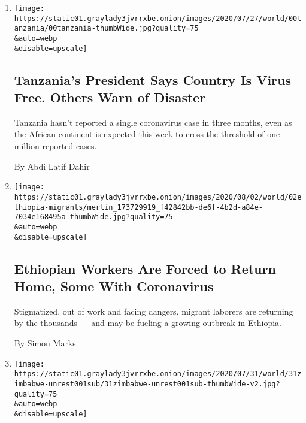 \begin{enumerate}
\def\labelenumi{\arabic{enumi}.}
\item
  \href{/2020/08/04/world/africa/tanzanias-coronavirus-president.html}{}

  \texttt{[image: https://static01.graylady3jvrrxbe.onion/images/2020/07/27/world/00tanzania/00tanzania-thumbWide.jpg?quality=75\\\&auto=webp\\\&disable=upscale]}

  \hypertarget{tanzanias-president-says-country-is-virus-free-others-warn-of-disaster}{%
  \subsection{Tanzania's President Says Country Is Virus Free. Others
  Warn of
  Disaster}\label{tanzanias-president-says-country-is-virus-free-others-warn-of-disaster}}

  Tanzania hasn't reported a single coronavirus case in three months,
  even as the African continent is expected this week to cross the
  threshold of one million reported cases.

  By Abdi Latif Dahir
\item
  \href{/2020/08/01/world/africa/ethiopian-migrant-workers-coronavirus.html}{}

  \texttt{[image: https://static01.graylady3jvrrxbe.onion/images/2020/08/02/world/02ethiopia-migrants/merlin\_173729919\_f42842bb-de6f-4b2d-a84e-7034e168495a-thumbWide.jpg?quality=75\\\&auto=webp\\\&disable=upscale]}

  \hypertarget{ethiopian-workers-are-forced-to-return-home-some-with-coronavirus}{%
  \subsection{Ethiopian Workers Are Forced to Return Home, Some With
  Coronavirus}\label{ethiopian-workers-are-forced-to-return-home-some-with-coronavirus}}

  Stigmatized, out of work and facing dangers, migrant laborers are
  returning by the thousands --- and may be fueling a growing outbreak
  in Ethiopia.

  By Simon Marks
\item
  \href{/2020/07/31/world/africa/zimbabwe-coronavirus-protest.html}{}

  \texttt{[image: https://static01.graylady3jvrrxbe.onion/images/2020/07/31/world/31zimbabwe-unrest001sub/31zimbabwe-unrest001sub-thumbWide-v2.jpg?quality=75\\\&auto=webp\\\&disable=upscale]}


\end{enumerate}
